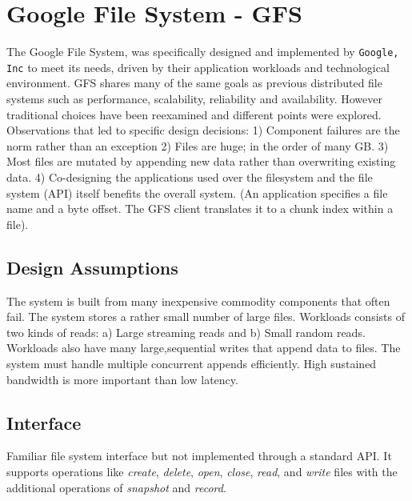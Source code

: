 \documentclass[letterpaper,twocolumn,10pt]{article}
\begin{document}
\section{Google File System - GFS}
The Google File System, was specifically designed and implemented by {\tt Google, Inc} to meet its needs, driven by their application workloads and technological environment.
GFS shares many of the same goals as previous distributed file systems such as performance, scalability, reliability and availability. However traditional choices have been reexamined and different points were explored.
Observations that led to specific design decisions:
1) Component failures are the norm rather than an exception
2) Files are huge; in the order of many GB.
3) Most files are mutated by appending new data rather than overwriting existing data.
4) Co-designing the applications used over the filesystem and the file system (API) itself benefits the overall system. (An application specifies a file name and a byte offset. The GFS client translates it to a chunk index within a file).

\subsection{Design Assumptions}
The system is built from many inexpensive commodity components that often fail.
The system stores a rather small number of large files.
Workloads consists of two kinds of reads: a) Large streaming reads and b) Small random reads.
Workloads also have many large,sequential writes that append data to files.
The system must handle multiple concurrent appends efficiently.
High sustained bandwidth is more important than low latency.

\subsection{Interface}
Familiar file system interface but not implemented through a standard API. It supports operations like \textit{create}, \textit{delete}, \textit{open}, \textit{close}, \textit{read}, and \textit{write} files with the additional operations of \textit{snapshot} and \textit{record}.
\end{document}
